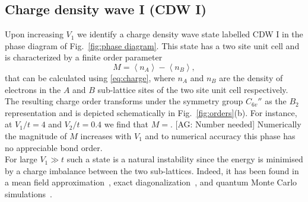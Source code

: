 \documentclass[aps,prx,10pt,twocolumn,floatfix,superscriptaddress,showpacs,numerical,footinbib]{revtex4-1}
\newcommand{\noteAG}[1]{{\color{blue} [AG: #1]}}
\begin{document}
\subsection{Charge density wave I (CDW I)}
%
Upon increasing $V_{1}$ we identify a charge density wave state labelled CDW I in the phase diagram of Fig.~\ref{fig:phase diagram}.
%
This state has a two site unit cell and is characterized by a finite order parameter
%
\begin{equation}
\label{eq:CDW}
%
M=\left\langle n_{A} \right\rangle-\left\langle n_{B}\right\rangle,
%
\end{equation}
%
that can be calculated using \eqref{eq:charge}, where $n_{A}$ and $n_{B}$ are the density of electrons in the $A$ and $B$ sub-lattice sites of the two site unit cell respectively. 
%
The resulting charge order transforms under the symmetry group $C_{6v}''$ as the $B_2$ representation and is depicted schematically in Fig.~\ref{fig:orders}(b). 
%
For instance, at $V_{1}/t = 4$ and $V_{2}/t = 0.4$ we find that $M=$. \noteAG{Number needed}
%
Numerically the magnitude of $M$ increases with $V_{1}$ and to numerical accuracy this phase has no appreciable bond order.\\
For large $V_{1}\gg t$ such a state is a natural instability since the energy is minimised by a charge imbalance between the two sub-lattices.
%
Indeed, it has been found in a mean field approximation~\cite{RQHZ08,WF10,GCC13}, exact diagonalization~\cite{GGNVC13,DH14,DCH14}, 
and quantum Monte Carlo simulations~\cite{WCT14}.
%
\end{document}
